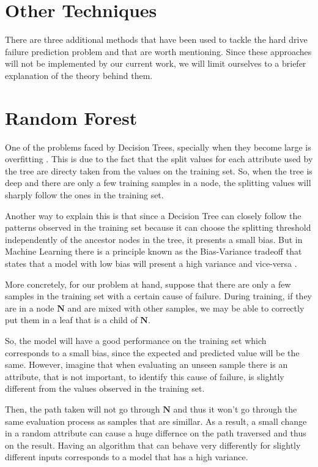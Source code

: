 \section{Other Techniques}

There are three additional methods that have been used to tackle the hard drive failure prediction problem and that are worth mentioning.
Since these approaches will not be implemented by our current work, we will limit ourselves to a briefer explanation of the theory behind them.

\section{Random Forest}\label{sec:randomforest}

One of the problems faced by Decision Trees, specially when they become large is overfitting \cite{ying2019overview}.
This is due to the fact that the split values for each attribute used by the tree are directy taken from the values on the training set.
So, when the tree is deep and there are only a few training samples in a node, the splitting values will sharply follow the ones in the training set.

Another way to explain this is that since a Decision Tree can closely follow the patterns observed in the training set because it can choose the splitting threshold independently of the ancestor nodes in the tree, it presents a small bias.
But in Machine Learning there is a principle known as the Bias-Variance tradeoff that states that a model with low bias will present a high variance and vice-versa \cite{briscoe2011conceptual}.

More concretely, for our problem at hand, suppose that there are only a few samples in the training set with a certain cause of failure.
During training, if they are in a node $\mathbf{N}$ and are mixed with other samples, we may be able to correctly put them in a leaf that is a child of $\mathbf{N}$.

So, the model will have a good performance on the training set which corresponds to a small bias, since the expected and predicted value will be the same.
However, imagine that when evaluating an unseen sample there is an attribute, that is not important, to identify this cause of failure, is slightly different from the values observed in the training set.

Then, the path taken will not go through $\mathbf{N}$ and thus it won't go through the same evaluation process as samples that are simillar.
As a result, a small change in a random attribute can cause a huge differnce on the path traversed and thus on the result.
Having an algorithm that can behave very differently for slightly different inputs corresponds to a model that has a high variance.

